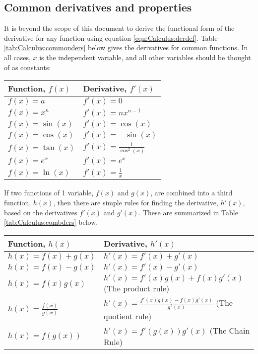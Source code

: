 \subsection{Common derivatives and properties}
It is beyond the scope of this document to derive the functional form of the derivative for any function using equation \ref{eqn:Calculus:derdef}. Table \ref{tab:Calculus:commonders} below gives the derivatives for common functions. In all cases, $x$ is the independent variable, and all other variables should be thought of as constants:

\begin{center}
\begin{tabular}{l l}
\textbf{Function, $f(x)$} & \textbf{Derivative, $f'(x)$}\\
\hline\hline
$f(x)=a$ & $f'(x)=0$ \\
$f(x)=x^n$ & $f'(x)=nx^{n-1}$ \\
$f(x)=\sin(x)$ & $f'(x)=\cos(x)$ \\
$f(x)=\cos(x)$ & $f'(x)=-\sin(x)$ \\
$f(x)=\tan(x)$ & $f'(x)=\frac{1}{\cos^2(x)}$ \\
$f(x)=e^x$ & $f'(x)=e^x$ \\
$f(x)=\ln(x)$ & $f'(x)=\frac{1}{x}$ \\
\hline
\end{tabular}
\end{center}
If two functions of 1 variable, $f(x)$ and $g(x)$, are combined into a third function, $h(x)$, then there are simple rules for finding the derivative, $h'(x)$, based on the derivatives $f'(x)$ and $g'(x)$. These are summarized in Table \ref{tab:Calculus:combders} below.
\begin{center}
\begin{tabular}{l l}
\textbf{Function, $h(x)$} & \textbf{Derivative, $h'(x)$}\\
\hline\hline
$h(x)=f(x)+g(x)$ & $h'(x)=f'(x)+g'(x)$ \\
$h(x)=f(x)-g(x)$ & $h'(x)=f'(x)-g'(x)$ \\
$h(x)=f(x)g(x)$ & $h'(x)=f'(x)g(x)+f(x)g'(x)$ (The product rule) \\
$h(x)=\frac{f(x)}{g(x)}$ & $h'(x)=\frac{f'(x)g(x)-f(x)g'(x)}{g^2(x)}$ (The quotient rule)\\
$h(x)=f(g(x))$ & $h'(x)=f'(g(x))g'(x)$ (The Chain Rule) \\
\hline
\end{tabular}
\end{center}
